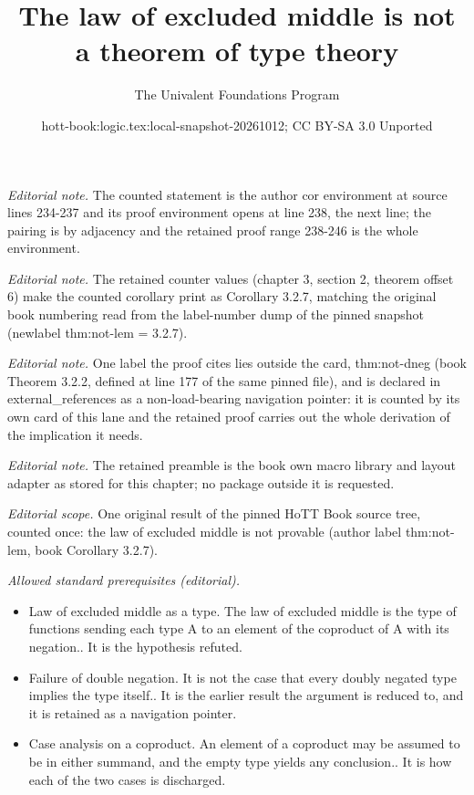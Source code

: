 \documentclass[10pt,a4paper]{article}
\title{The law of excluded middle is not a theorem of type theory}
\author{The Univalent Foundations Program}
\date{hott-book:logic.tex:local-snapshot-20261012; CC BY-SA 3.0 Unported}
\newcounter{chapter}
\theoremstyle{definition}
\theoremstyle{remark}
\numberwithin{equation}{section}
\begin{document}
\maketitle
\setcounter{chapter}{3}
\setcounter{section}{2}
\setcounter{thm}{6}
\noindent\textit{Editorial note.} The counted statement is the author cor environment at source lines 234-237 and its proof environment opens at line 238, the next line; the pairing is by adjacency and the retained proof range 238-246 is the whole environment.\par\medskip
\noindent\textit{Editorial note.} The retained counter values (chapter 3, section 2, theorem offset 6) make the counted corollary print as Corollary 3.2.7, matching the original book numbering read from the label-number dump of the pinned snapshot (newlabel thm:not-lem = 3.2.7).\par\medskip
\noindent\textit{Editorial note.} One label the proof cites lies outside the card, thm:not-dneg (book Theorem 3.2.2, defined at line 177 of the same pinned file), and is declared in external\_references as a non-load-bearing navigation pointer: it is counted by its own card of this lane and the retained proof carries out the whole derivation of the implication it needs.\par\medskip
\noindent\textit{Editorial note.} The retained preamble is the book own macro library and layout adapter as stored for this chapter; no package outside it is requested.\par\medskip
\noindent\textit{Editorial scope.} One original result of the pinned HoTT Book source tree, counted once: the law of excluded middle is not provable (author label thm:not-lem, book Corollary 3.2.7).\par\medskip
\noindent\textit{Allowed standard prerequisites (editorial).}\begin{itemize}
\item Law of excluded middle as a type. The law of excluded middle is the type of functions sending each type A to an element of the coproduct of A with its negation.. It is the hypothesis refuted.
\item Failure of double negation. It is not the case that every doubly negated type implies the type itself.. It is the earlier result the argument is reduced to, and it is retained as a navigation pointer.
\item Case analysis on a coproduct. An element of a coproduct may be assumed to be in either summand, and the empty type yields any conclusion.. It is how each of the two cases is discharged.
\end{itemize}\medskip
\end{document}

